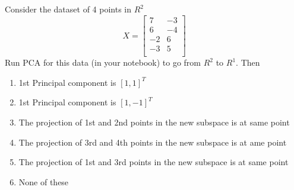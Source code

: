 \begin{frame}
\section{}
Consider the dataset of 4 points in $R^2$
    \[X=\begin{bmatrix}
    7 & -3 \\
    6 & -4 \\
    -2 & 6 \\
    -3 & 5 \\
    \end{bmatrix}
\]
Run PCA for this data (in your notebook) to go from $R^2$ to $R^1$. Then
\begin{enumerate}
\item 1st Principal component is $[1,1]^T$
\item 1st Principal component is $[1,-1]^T$     %
\item The projection of 1st and 2nd points in the new subspace is at same point     %
\item The projection of 3rd and 4th points in the new subspace  is at ame point     %
\item The projection of 1st and 3rd points in the new subspace is at same point
\item None of these     %
\end{enumerate}
\end{frame}
